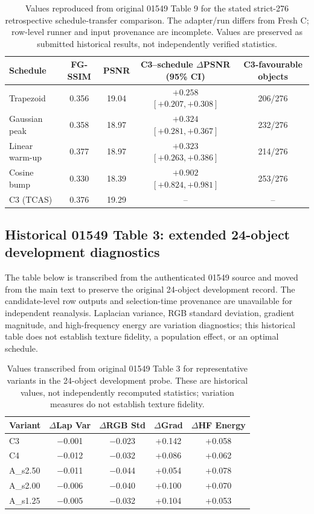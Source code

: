 \documentclass[11pt]{article}
\begin{document}
\begin{table}[ht]
\centering\small
\caption{Values reproduced from original 01549 Table 9 for the stated strict-276 retrospective schedule-transfer comparison. The adapter/run differs from Fresh C; row-level runner and input provenance are incomplete. Values are preserved as submitted historical results, not independently verified statistics.}
\label{tab:historical-table9}
\begin{tabular}{lcccc}
\toprule
Schedule & FG-SSIM & PSNR & C3--schedule $\Delta$PSNR (95\% CI) & C3-favourable objects \\
\midrule
Trapezoid & 0.356 & 19.04 & $+0.258$ $[+0.207,+0.308]$ & 206/276 \\
Gaussian peak & 0.358 & 18.97 & $+0.324$ $[+0.281,+0.367]$ & 232/276 \\
Linear warm-up & 0.377 & 18.97 & $+0.323$ $[+0.263,+0.386]$ & 214/276 \\
Cosine bump & 0.330 & 18.39 & $+0.902$ $[+0.824,+0.981]$ & 253/276 \\
C3 (TCAS) & 0.376 & 19.29 & -- & -- \\
\bottomrule
\end{tabular}
\end{table}

\subsection*{Historical 01549 Table 3: extended 24-object development diagnostics}
The table below is transcribed from the authenticated 01549 source and moved from the main text to preserve the original 24-object development record. The candidate-level row outputs and selection-time provenance are unavailable for independent reanalysis. Laplacian variance, RGB standard deviation, gradient magnitude, and high-frequency energy are variation diagnostics; this historical table does not establish texture fidelity, a population effect, or an optimal schedule.

\begin{table}[ht]
\centering\small
\caption{Values transcribed from original 01549 Table 3 for representative variants in the 24-object development probe. These are historical values, not independently recomputed statistics; variation measures do not establish texture fidelity.}\label{tab:historical-table3}
\begin{tabular}{lcccc}
\toprule
Variant & $\Delta$Lap Var & $\Delta$RGB Std & $\Delta$Grad & $\Delta$HF Energy \\
\midrule
C3 & $-$0.001 & $-$0.023 & +0.142 & +0.058 \\
C4 & $-$0.012 & $-$0.032 & +0.086 & +0.062 \\
A\_s2.50 & $-$0.011 & $-$0.044 & +0.054 & +0.078 \\
A\_s2.00 & $-$0.006 & $-$0.040 & +0.100 & +0.070 \\
A\_s1.25 & $-$0.005 & $-$0.032 & +0.104 & +0.053 \\
\bottomrule
\end{tabular}
\end{table}
\end{document}

